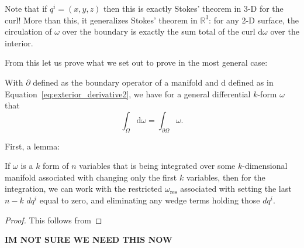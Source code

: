 \documentclass[../master.tex]{subfiles}
\begin{document}
	
	Note that if $q^i = (x,y,z)$ then this is exactly Stokes' theorem in 3-D for the curl! More than this, it generalizes Stokes' theorem in $\mathbb{R}^3$: for any 2-D surface, the circulation of $\omega$ over the boundary is exactly the sum total of the curl $\mathrm d \omega$ over the interior.
	
	From this let us prove what we set out to prove in the most general case:
	{
	\renewcommand{\thetheorem}{\ref{thm:GeneralStokes}}
	\begin{theorem}
		With $\partial$ defined as the boundary operator of a manifold and $\mathrm d$ defined as in Equation~\eqref{eq:exterior_derivative2}, we have for a general differential $k$-form $\omega$ that
		\begin{equation*} 
			\int_\Omega \mathrm d \omega = \int_{\partial \Omega} \omega.
		\end{equation*}
	\end{theorem}
	\addtocounter{theorem}{-1}
	}
	First, a lemma:
	
	\begin{lemma}
		If $\omega$ is a $k$ form of $n$ variables that is being integrated over some $k$-dimensional manifold associated with changing only the first $k$ variables, then for the integration, we can work with the restricted $\omega_{\text{res}}$ associated with setting the last $n-k$ $dq^i$ equal to zero, and eliminating any wedge terms holding those $dq^i$.
	\end{lemma}
	\begin{proof}
		This follows from
	\end{proof}
	\textbf{IM NOT SURE WE NEED THIS NOW}
	
\end{document}
